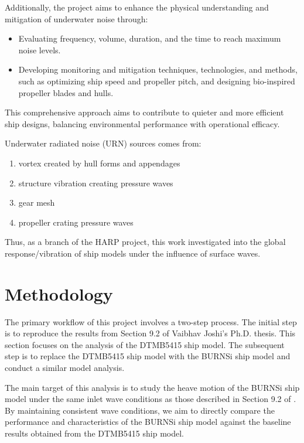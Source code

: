 \documentclass[12pt]{article} %
\begin{document}
Additionally, the project aims to enhance the physical understanding and mitigation of underwater noise through:

\begin{itemize}
    \item Evaluating frequency, volume, duration, and the time to reach maximum noise levels.
    \item Developing monitoring and mitigation techniques, technologies, and methods, such as optimizing ship speed and propeller pitch, and designing bio-inspired propeller blades and hulls.
\end{itemize}

This comprehensive approach aims to contribute to quieter and more efficient ship designs, balancing environmental performance with operational efficacy.

Underwater radiated noise (URN) sources comes from:
\begin{enumerate}
    \item vortex created by hull forms and appendages
    \item structure vibration creating pressure waves
    \item gear mesh
    \item propeller crating pressure waves
\end{enumerate}
Thus, as a branch of the HARP project, this work investigated into the global response/vibration of ship models under the influence of surface waves. 




\newpage
\section{Methodology}
The primary workflow of this project involves a two-step process. The initial step is to reproduce the results from Section 9.2 of Vaibhav Joshi's Ph.D. thesis\cite{joshi2018}. This section focuses on the analysis of the DTMB5415 ship model. The subsequent step is to replace the DTMB5415 ship model with the BURNSi ship model and conduct a similar model analysis.

The main target of this analysis is to study the heave motion of the BURNSi ship model under the same inlet wave conditions as those described in Section 9.2 of \cite{joshi2018}. By maintaining consistent wave conditions, we aim to directly compare the performance and characteristics of the BURNSi ship model against the baseline results obtained from the DTMB5415 ship model.
\end{document}
